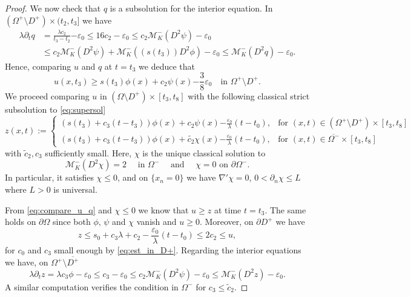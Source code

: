 \documentclass[12pt]{article}
\numberwithin{Theorem}{section}
\theoremstyle{definition}
\theoremstyle{remark}
\numberwithin{equation}{section}
\newcommand{\p}{\partial}
\newcommand{\eps}{\varepsilon}
\begin{document}
\begin{proof}
We now check that $q$ is a subsolution for the interior equation. In $(\Omega^+ \setminus D^+) \times (t_2,t_3]$ we have
\begin{align*}
    \lambda \p_t q  &= \frac{\lambda c_2}{t_3-t_2} {-\eps_0} \leq 16c_2 -\eps_0 \leq c_2\mathcal{M}_K^-(D^2 \psi) -\eps_0 \\
    &\leq c_2  \mathcal{M}_K^-(D^2 \psi) 
    + \mathcal{M}_K^-((s(t_3))D^2 \phi) -\eps_0 \leq \mathcal{M}_K^-(D^2 q)-\eps_0.
\end{align*}
Hence, comparing $u$ and $q$ at $t=t_3$ we deduce that
\begin{equation} \label{eq:compare_u_q}
    u(x,t_3) \geq s(t_3) \phi(x) + c_2 \psi(x) {-\frac{3}{8}\eps_0}\quad \text{in } \Omega^+ \setminus D^+.
\end{equation}
We proceed comparing $u$ in $\left( \Omega \setminus D^+\right) \times[t_3,t_8]$ with the following classical strict subsolution to \eqref{eq:supersol}
\[
z(x,t):=
\begin{cases}
    \left(s(t_3) + c_3(t-t_3)\right) \phi(x) + c_2 \psi(x) {-\frac{\eps_0}{\lambda}(t-t_0)}, &\text{for } (x,t)\in \left( \Omega^+ \setminus D^+\right) \times[t_3,t_8]\\
    \left(s(t_3) + c_3(t-t_3)\right) \phi(x) + \tilde{c_2} \chi(x) {-\frac{\eps_0}{\lambda}(t-t_0)}, &\text{for } (x,t)\in  \overline{\Omega^-} \times[t_3,t_8]
\end{cases}
\]
with $\tilde c_2, c_3$ sufficiently small. Here, $\chi$ is the unique classical solution to
\[
    \mathcal M_K^-(D^2 \chi)=2 \quad \text{ in } \Omega^- \quad \text{ and } \quad \chi=0 \text{ on } \p\Omega^-.
\]
In particular, it satisfies $\chi\leq 0$, and on $\{x_n=0\}$ we have  $\nabla' \chi=0$, $0 <\p_n \chi\leq L$ where $L>0$ is universal.


From \eqref{eq:compare_u_q} and $\chi \leq 0$ we know that $u \geq z$ at time $t=t_3$. The same holds on $\p \Omega$ since both $\phi,\, \psi$  and $\chi$ vanish and $u\geq0$. Moreover, on $\p D^+$ we have
\[
z \leq s_0 + c_3\lambda+c_2 -\frac{\eps_0}{\lambda}(t-t_0) \leq 2c_2 \leq u,
\]
for $c_0$ and $c_3$ small enough by \eqref{eq:est_in_D+}.
Regarding the interior equations we have, on $\Omega^+\setminus \overline {D^+}$
\[
\lambda \p_t z = \lambda c_3 \phi -\eps_0 \leq c_3 -\eps_0 \leq c_2 \mathcal{M}_K^-(D^2 \psi) -\eps_0 \leq \mathcal{M}_K^-(D^2 z)-\eps_0.
\]
A similar computation verifies the condition in $\Omega^-$ for $c_3 \leq \tilde c_2$.




\end{proof}
\end{document}
